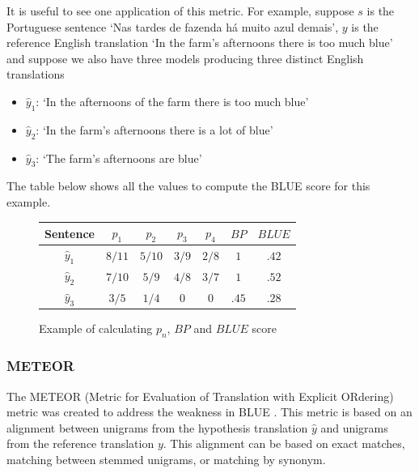 It is useful to see one application of this metric. For example, suppose $s$ is the Portuguese sentence `Nas tardes de fazenda há muito azul demais', $y$ is the reference English translation `In the farm's afternoons there is too much blue' and suppose we also have three models producing three distinct English translations 

\begin{itemize}
\item $\hat{y}_1$: `In the afternoons of the farm there is too much blue'
\item $\hat{y}_2$: `In the farm's afternoons there is a lot of blue'
\item $\hat{y}_3$: `The farm's afternoons are blue'
\end{itemize}


The table below shows all the values to compute the BLUE score for this example.

\begin{figure}[h]
\label{bluetable}
\begin{center}
\begin{tabular}{|c|c|c|c|c|c|c|}
\hline
\cellcolor{blue!10} Sentence & \cellcolor{blue!10} $p_1$ & \cellcolor{blue!10} $p_2$ & \cellcolor{blue!10} $p_3$ & \cellcolor{blue!10} $p_4$ & \cellcolor{blue!10} $BP$ & \cellcolor{blue!10} $BLUE$ \\ \hline
\cellcolor{blue!10} $\hat{y}_1$ & $8/11$ & $5/10$ & $3/9$ & $2/8$ & $1$ & $.42$\\ \hline
\cellcolor{blue!10} $\hat{y}_2$ & $7/10$ & $5/9$ & $4/8$ & $3/7$ & $1$ & $.52$\\ \hline
\cellcolor{blue!10} $\hat{y}_3$ & $3/5$ & $1/4$ & $0$ & $0$ & $.45$ & $.28$\\ \hline
\end{tabular}
\end{center}
\caption{Example of calculating $p_n$, $BP$ and $BLUE$ score}
\end{figure}

\subsubsection{METEOR}



The METEOR (Metric for Evaluation of Translation with Explicit ORdering) metric was created to address the weakness in BLUE \cite{Lavie}. This metric is based on an alignment between unigrams from the hypothesis translation $\hat{y}$ and unigrams from the reference translation $y$. This alignment can be based on exact matches, matching between stemmed unigrams, or matching by synonym.

